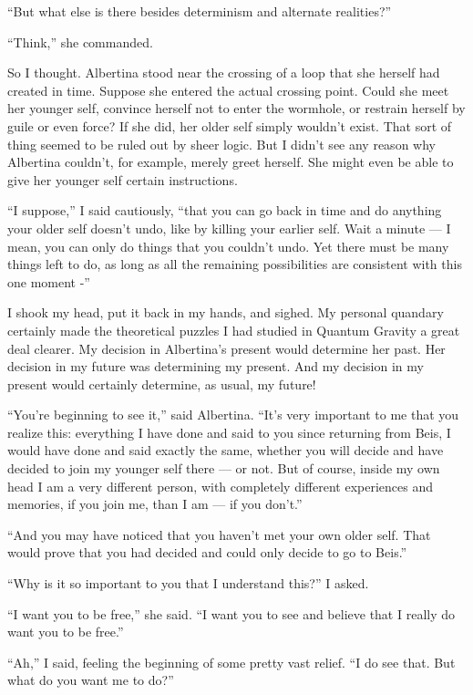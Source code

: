 \documentclass[english,11pt,letterpaper,onecolumn]{scrbook}
\begin{document}
	``But what else is there besides determinism and alternate realities?''

	``Think,'' she commanded.

	So I thought.  Albertina stood near the crossing of a loop that she herself had created in time.  Suppose she entered the actual crossing point.  Could she meet her younger self, convince herself not to enter the wormhole, or restrain herself by guile or even force?  If she did, her older self simply wouldn't exist.  That sort of thing seemed to be ruled out by sheer logic.  But I didn't see any reason why Albertina couldn't, for example, merely greet herself.  She might even be able to give her younger self certain instructions.  

	``I suppose,'' I said cautiously, ``that you can go back in time and do anything your older self doesn't undo, like by killing your earlier self.  Wait a minute --- I mean, you can only do things that you couldn't undo.  Yet there must be many things left to do, as long as all the remaining possibilities are consistent with this one moment -''

	I shook my head, put it back in my hands, and sighed.  My personal quandary certainly made the theoretical puzzles I had studied in Quantum Gravity a great deal clearer.  My decision in Albertina's present would determine her past.  Her decision in my future was determining my present.  And my decision in my present would certainly determine, as usual, my future!

	``You're beginning to see it,'' said Albertina.  ``It's very important to me that you realize this:  everything I have done and said to you since returning from Beis, I would have done and said exactly the same, whether you will decide and have decided to join my younger self there --- or not.  But of course, inside my own head I am a very different person, with completely different experiences and memories, if you join me, than I am --- if you don't.''

	``And you may have noticed that you haven't met your own older self.  That would prove that you had decided and could only decide to go to Beis.''

	``Why is it so important to you that I understand this?'' I asked.

	``I want you to be free,'' she said.  ``I want you to see and believe that I really do want you to be free.''

	``Ah,'' I said, feeling the beginning of some pretty vast relief.  ``I do see that.  But what do you want me to do?''
\end{document}
